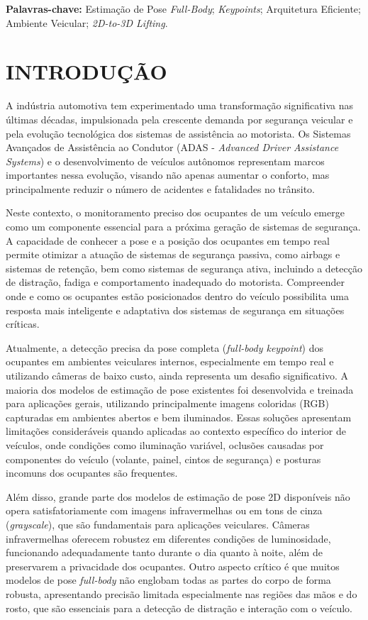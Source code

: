 \documentclass[12pt, a4paper]{article}
\begin{document}
\vspace{0.5cm}
\noindent\textbf{Palavras-chave:} Estimação de Pose \textit{Full-Body}; \textit{Keypoints}; Arquitetura Eficiente; Ambiente Veicular; \textit{2D-to-3D Lifting}.

\section{INTRODUÇÃO}

A indústria automotiva tem experimentado uma transformação significativa nas últimas décadas, impulsionada pela crescente demanda por segurança veicular e pela evolução tecnológica dos sistemas de assistência ao motorista. Os Sistemas Avançados de Assistência ao Condutor (ADAS - \textit{Advanced Driver Assistance Systems}) e o desenvolvimento de veículos autônomos representam marcos importantes nessa evolução, visando não apenas aumentar o conforto, mas principalmente reduzir o número de acidentes e fatalidades no trânsito.

Neste contexto, o monitoramento preciso dos ocupantes de um veículo emerge como um componente essencial para a próxima geração de sistemas de segurança. A capacidade de conhecer a pose e a posição dos ocupantes em tempo real permite otimizar a atuação de sistemas de segurança passiva, como airbags e sistemas de retenção, bem como sistemas de segurança ativa, incluindo a detecção de distração, fadiga e comportamento inadequado do motorista. Compreender onde e como os ocupantes estão posicionados dentro do veículo possibilita uma resposta mais inteligente e adaptativa dos sistemas de segurança em situações críticas.

Atualmente, a detecção precisa da pose completa (\textit{full-body keypoint}) dos ocupantes em ambientes veiculares internos, especialmente em tempo real e utilizando câmeras de baixo custo, ainda representa um desafio significativo. A maioria dos modelos de estimação de pose existentes foi desenvolvida e treinada para aplicações gerais, utilizando principalmente imagens coloridas (RGB) capturadas em ambientes abertos e bem iluminados. Essas soluções apresentam limitações consideráveis quando aplicadas ao contexto específico do interior de veículos, onde condições como iluminação variável, oclusões causadas por componentes do veículo (volante, painel, cintos de segurança) e posturas incomuns dos ocupantes são frequentes.

Além disso, grande parte dos modelos de estimação de pose 2D disponíveis não opera satisfatoriamente com imagens infravermelhas ou em tons de cinza (\textit{grayscale}), que são fundamentais para aplicações veiculares. Câmeras infravermelhas oferecem robustez em diferentes condições de luminosidade, funcionando adequadamente tanto durante o dia quanto à noite, além de preservarem a privacidade dos ocupantes. Outro aspecto crítico é que muitos modelos de pose \textit{full-body} não englobam todas as partes do corpo de forma robusta, apresentando precisão limitada especialmente nas regiões das mãos e do rosto, que são essenciais para a detecção de distração e interação com o veículo.
\end{document}
